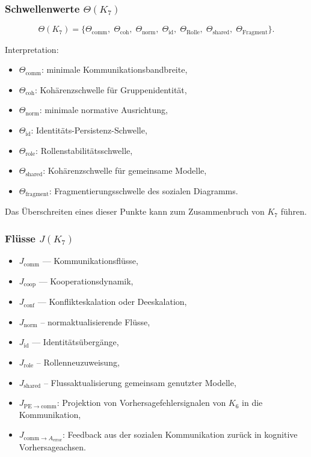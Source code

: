 \subsubsection{Schwellenwerte \texorpdfstring{$\Theta(K_7)$}{\Theta(K_7)}}

\[
\Theta(K_7)=
\{
\Theta_{\mathrm{comm}},\;
\Theta_{\mathrm{coh}},\;
\Theta_{\mathrm{norm}},\;
\Theta_{\mathrm{id}},\;
\Theta_{\mathrm{Rolle}},\;
\Theta_{\mathrm{shared}},\;
\Theta_{\mathrm{Fragment}}
\}.
\]

Interpretation:
\begin{itemize}
    \item $\Theta_{\mathrm{comm}}$: minimale Kommunikationsbandbreite,
    \item $\Theta_{\mathrm{coh}}$: Kohärenzschwelle für Gruppenidentität,
    \item $\Theta_{\mathrm{norm}}$: minimale normative Ausrichtung,
    \item $\Theta_{\mathrm{id}}$: Identitäts-Persistenz-Schwelle,
    \item $\Theta_{\mathrm{role}}$: Rollenstabilitätsschwelle,
    \item $\Theta_{\mathrm{shared}}$: Kohärenzschwelle für gemeinsame Modelle,
    \item $\Theta_{\mathrm{fragment}}$: Fragmentierungsschwelle des sozialen Diagramms.
\end{itemize}

Das Überschreiten eines dieser Punkte kann zum Zusammenbruch von $K_7$ führen.

\subsubsection{Flüsse \texorpdfstring{$J(K_7)$}{J(K_7)}}

\begin{itemize}
    \item $J_{\mathrm{comm}}$ — Kommunikationsflüsse,
    \item $J_{\mathrm{coop}}$ — Kooperationsdynamik,
    \item $J_{\mathrm{conf}}$ — Konflikteskalation oder Deeskalation,
    \item $J_{\mathrm{norm}}$ – normaktualisierende Flüsse,
    \item $J_{\mathrm{id}}$ — Identitätsübergänge,
    \item $J_{\mathrm{role}}$ – Rollenneuzuweisung,
    \item $J_{\mathrm{shared}}$ – Flussaktualisierung gemeinsam genutzter Modelle,
    \item $J_{\mathrm{PE}\to\mathrm{comm}}$: Projektion von Vorhersagefehlersignalen von $K_6$ in die Kommunikation,
    \item $J_{\mathrm{comm}\to A_{\mathrm{error}}}$: Feedback aus der sozialen Kommunikation zurück in kognitive Vorhersageachsen.
\end{itemize}

